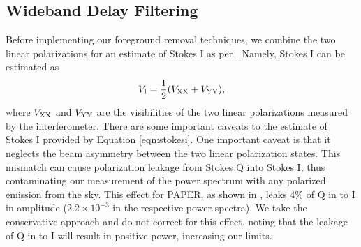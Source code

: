 \documentclass[twocolumn,numberedappendix]{emulateapj} \shorttitle{New Limits on the 21 cm Power Spectrum at $z=8.4$}
\begin{document}
%
%



\subsection{Wideband Delay Filtering}\label{sec:wbd_filtering}


Before implementing our foreground removal techniques, we combine the two
linear polarizations for an estimate of Stokes I as per \citet{moore_et_al2013}.
Namely, Stokes I can be estimated as 
\begin{equation}\label{eqn:stokesi}
    V_{\rm I} = \frac12(V_{\rm XX}+V_{\rm YY}),
\end{equation}
where $V_{\rm XX}$ and $V_{\rm YY}$ are the visibilities of the two linear
polarizations measured by the interferometer. There are some important caveats
to the estimate of Stokes I provided by Equation \eqref{eqn:stokesi}. One
important caveat is that it neglects the beam asymmetry  between the two linear
polarization states. This mismatch can cause polarization leakage from Stokes
Q into Stokes I, thus contaminating  our measurement of the power spectrum with any polarized emission from the sky.
This effect for PAPER, as shown in \citet{moore_et_al2013}, leaks 4\% of Q in to
I  in amplitude ($2.2\times10^{-3}$ in the respective power spectra).  We take the conservative approach and do not correct for this effect, noting that the leakage of Q in to I will result in positive power, increasing our limits.
\end{document}
